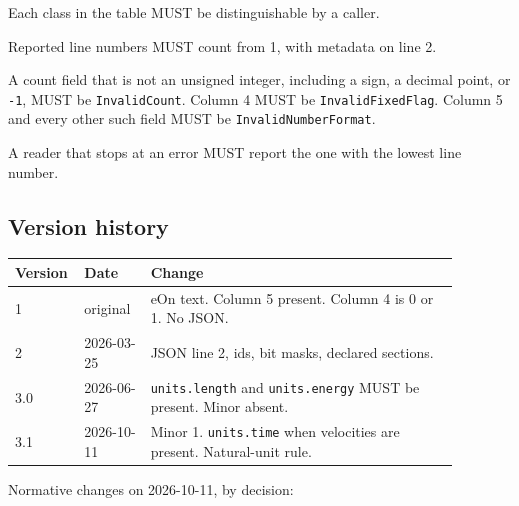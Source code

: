 \begin{description}
\tightlist
\item[CON-error.1 (MUST)] Each class in the table MUST be distinguishable by a caller.
\item[CON-error.2 (MUST)] Reported line numbers MUST count from 1, with metadata on line
2.
\item[CON-error.3 (MUST)] A count field that is not an unsigned integer, including a sign,
a decimal point, or \texttt{-1}, MUST be \texttt{InvalidCount}. Column 4
MUST be \texttt{InvalidFixedFlag}. Column 5 and every other such field
MUST be \texttt{InvalidNumberFormat}.
\item[CON-error.4 (MUST)] A reader that stops at an error MUST report the one with the
lowest line number.
\end{description}

\subsection*{Version history}\label{spec:version-history}

\begin{center}
\footnotesize
\begin{tabular}{@{}p{0.09\linewidth}p{0.14\linewidth}p{0.65\linewidth}@{}}
\toprule
\raggedright Version & \raggedright Date & \raggedright Change \tabularnewline
\midrule
\raggedright 1 & \raggedright original & \raggedright eOn text. Column 5 present. Column 4 is 0 or 1. No
JSON. \tabularnewline
\raggedright 2 & \raggedright 2026-03-25 & \raggedright JSON line 2, ids, bit masks, declared sections. \tabularnewline
\raggedright 3.0 & \raggedright 2026-06-27 & \raggedright \texttt{units.length} and \texttt{units.energy} MUST
be present. Minor absent. \tabularnewline
\raggedright 3.1 & \raggedright 2026-10-11 & \raggedright Minor 1. \texttt{units.time} when velocities are
present. Natural-unit rule. \tabularnewline
\bottomrule
\end{tabular}
\end{center}

Normative changes on 2026-10-11, by decision:

